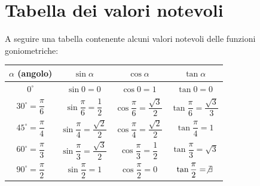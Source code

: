 \documentclass[12pt]{article}
\begin{document}
\section{Tabella dei valori notevoli}
A seguire una tabella contenente alcuni valori notevoli delle funzioni goniometriche:
\begin{center}
    \begin{tabular}{|| c | c | c | c ||}
        \hline
        $\alpha$ (angolo) & $\sin{\alpha}$ & $\cos{\alpha}$ & $\tan{\alpha}$ \\
        \hline
        $0^{\circ}$ & $\sin{0} = 0$ & $\cos{0} = 1$ & $\tan{0} = 0$ \\
        \hline
        $30^{\circ} = \dfrac{\pi}{6}$ & $\sin{\dfrac{\pi}{6}} = \dfrac{1}{2}$ & $\cos{\dfrac{\pi}{6}} = \dfrac{\sqrt{3}}{2}$ & $\tan{\dfrac{\pi}{6}} = \dfrac{\sqrt{3}}{3}$ \\
        \hline
        $45^{\circ} = \dfrac{\pi}{4}$ & $\sin{\dfrac{\pi}{4}} = \dfrac{\sqrt{2}}{2}$ & $\cos{\dfrac{\pi}{4}} = \dfrac{\sqrt{2}}{2}$ & $\tan{\dfrac{\pi}{4}} = 1$ \\
        \hline
        $60^{\circ} = \dfrac{\pi}{3}$ & $\sin{\dfrac{\pi}{3}} = \dfrac{\sqrt{3}}{2}$ & $\cos{\dfrac{\pi}{3}} = \dfrac{1}{2}$ & $\tan{\dfrac{\pi}{3}} = \sqrt{3}$ \\
        \hline
        $90^{\circ} = \dfrac{\pi}{2}$ & $\sin{\dfrac{\pi}{2}} = 1$ & $\cos{\dfrac{\pi}{2}} = 0$ & $\tan{\dfrac{\pi}{2}} = \not\exists$ \\
        \hline
    \end{tabular}
\end{center}
\pagebreak
\end{document}
